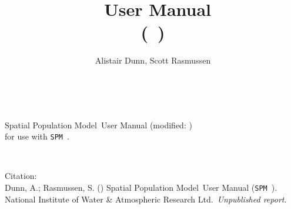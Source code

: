 \documentclass[10pt,twoside,pdftex]{article}
\title{\SPMName\ User Manual \\(\SPM\ \VER)}
\author{Alistair Dunn, Scott Rasmussen}
\date{\DocDate}
\renewcommand{\headrulewidth}{0pt}
\newcommand{\DocYear}{\SourceControlYearDoc}
\newcommand{\DocVer}{\SourceControlDateDoc}
\newcommand{\VER}{\small{}\normalsize}
\newcommand{\SPM}{\texttt{SPM}}
\newcommand{\SPMName}{Spatial Population Model}
\newcommand{\Organisation}{National Institute of Water \& Atmospheric Research Ltd.}
\newcommand{\ManualRef}{Dunn, A.; Rasmussen, S. (\DocYear) \SPMName\ User Manual (\SPM\ \VER). \Organisation\ \emph{Unpublished report}.}
\begin{document}
\maketitle
\thispagestyle{empty}
~\vfill
\begin{center}
\SPMName\ User Manual (modified: \DocVer) \\
for use with \SPM\ \VER.
\end{center}

\cleardoublepage{}
\fancyfoot[C]{\thepage}
~\vfill
\begin{center}
{Citation:\\ \ManualRef}
\end{center}

\cleardoublepage{}
\tableofcontents{}

\cleardoublepage{}
\renewcommand{\headrulewidth}{0.2pt}
\fancyhead[LE]{\slshape \nouppercase \rightmark}
\fancyhead[RO]{\slshape \nouppercase \leftmark}


\cleardoublepage{}


\cleardoublepage{}


\cleardoublepage{}


\cleardoublepage{}


\cleardoublepage{}


\cleardoublepage{}
\label{sec:syntax}
\cleardoublepage{}

\cleardoublepage{}

\cleardoublepage{}


\cleardoublepage{}


\cleardoublepage{}


\cleardoublepage{}


\cleardoublepage{}


\cleardoublepage{}


\cleardoublepage{}


\cleardoublepage{}

\renewcommand{\bibsection}{%
  \section{References}}


\cleardoublepage{}


\cleardoublepage{}
\printindex
\end{document}
